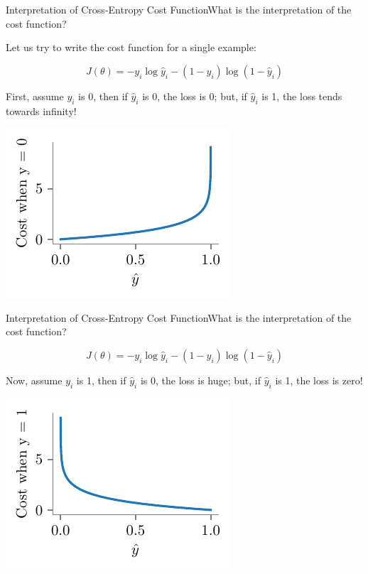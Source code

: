 \documentclass{beamer}
\begin{document}
\begin{frame}{Interpretation of Cross-Entropy Cost Function}\pause What is the interpretation of the cost function?

\pause Let us try to write the cost function for a single example:

\pause $$J(\theta) = -y_i\log{\hat{y}_i} - (1-y_i)\log({1-\hat{y}_i})$$

\pause First, assume $y_i$ is 0, then if $\hat{y}_i$ is 0, the loss is 0; but, if $\hat{y}_i$ is 1, the loss tends towards infinity!

	\includegraphics[scale=0.7]{../figures/logistic-regression/logistic-cross-cost-0}


\end{frame}

\begin{frame}{Interpretation of Cross-Entropy Cost Function}\pause What is the interpretation of the cost function?



 $$J(\theta) = -y_i\log{\hat{y}_i} - (1-y_i)\log({1-\hat{y}_i})$$

\pause Now, assume $y_i$ is 1, then if $\hat{y}_i$ is 0, the loss is huge; but, if $\hat{y}_i$ is 1, the loss is zero!

\includegraphics[scale=0.7]{../figures/logistic-regression/logistic-cross-cost-1}


\end{frame}
\end{document}
